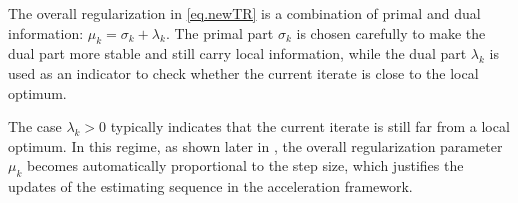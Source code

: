 \documentclass{article}
\numberwithin{equation}{section}
\newcommand{\trp}{\textrm{TR}_+}
\numberwithin{equation}{section}
\begin{document}
\begin{subroutine}[!ht]
    \small
    \caption{Local Detection (LD) }\label{alg.local detection}
    \begin{algorithmic}[1]
        \label{line.if coro 3.1}
        \ENDIF
        \label{line.track 1 number of iter}
        \ENDIF
        \ENDFOR
        \ELSE
        \ENDIF
        \STATE{$(d,\mu) = \trp(y,0,r)$
            \label{line.linear system oracle}
        }
        \ENDIF
        \ENDWHILE
    \end{algorithmic}
    \normalsize
\end{subroutine}
The overall regularization in \ref{eq.newTR} is a combination of primal and dual information: $\mu_k = \sigma_k + \lambda_k$. The primal part $\sigma_k$ is chosen carefully to make the dual part more stable and still carry local information, while the dual part $\lambda_k$ is used as an indicator to check whether the current iterate is close to the local optimum.


The case $\lambda_k > 0$ typically indicates that the current iterate is still far from a local optimum. In this regime, as shown later in , the overall regularization parameter $\mu_k$ becomes automatically proportional to the step size, which justifies the updates of the estimating sequence in the acceleration framework.
\end{document}
